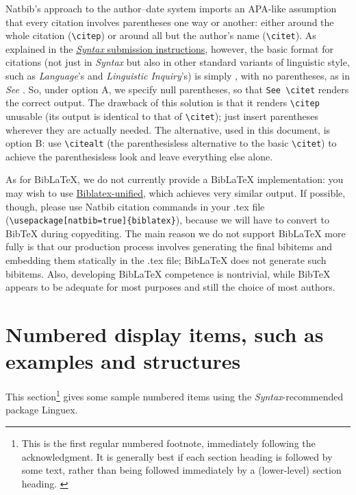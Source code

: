 \documentclass[letterpaper,12pt, twoside]{article}
\begin{document}
Natbib's approach to the author--date system imports an APA-like assumption that every citation involves parentheses one way or another: either around the whole citation (\verb|\citep|) or around all but the author's name (\verb|\citet|). As explained in the \href{https://docs.google.com/document/d/1T0zHwq2b53VnqF18c8PKd-W_FWKqhKF0gkbBndoxj28/edit?usp=sharing}{\emph{Syntax} submission instructions}, however, the basic format for citations (not just in \emph{Syntax} but also in other standard variants of linguistic style, such as \emph{Language}'s and \emph{Linguistic Inquiry}'s) is simply \emph{\citealt{journalarticle}}, with no parentheses, as in \emph{See \citealt{journalarticle}}. So, under option A, we specify null parentheses, so that \verb|See \citet| renders the correct output. The drawback of this solution is that it renders \verb|\citep| unusable (its output is identical to that of \verb|\citet|); just insert parentheses wherever they are actually needed. The alternative, used in this document, is option B: use \verb|\citealt| (the parenthesisless alternative to the basic \verb|\citet|) to achieve the parenthesisless look and leave everything else alone.

As for BibLaTeX, we do not currently provide a BibLaTeX implementation: you may wish to use \href{https://ctan.org/pkg/biblatex-unified}{Biblatex-unified}, which achieves very similar output. If possible, though, please use  Natbib citation commands in your .tex file (\verb|\usepackage[natbib=true]{biblatex}|), because we will have to convert to BibTeX during copyediting. The main reason we do not support BibLaTeX more fully is that our production process involves generating the final bibitems and embedding them statically in the .tex file; BibLaTeX does not generate such bibitems. Also, developing BibLaTeX competence is nontrivial, while BibTeX appears to be adequate for most purposes and still the choice of most authors.



\section{Numbered display items, such as examples and structures}\label{secexs}
This section\footnote{This is the first regular numbered footnote, immediately following the acknowledgment. It is generally best if each section heading is followed by some text, rather than being followed immediately by a (lower-level) section heading. \label{padding}}   gives some sample numbered items using the \emph{Syntax}-recommended package {Linguex}. 
\end{document}
